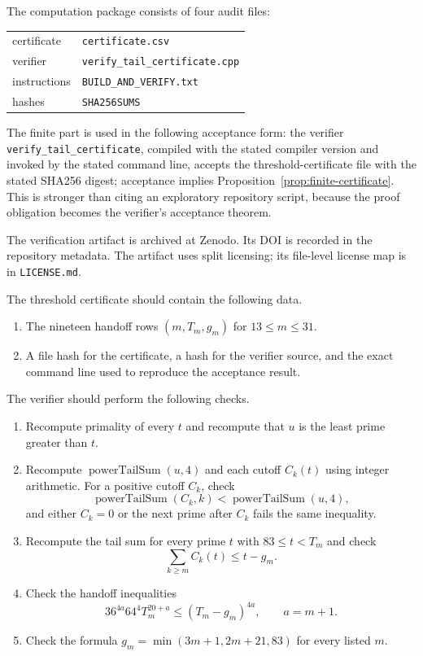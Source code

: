 \documentclass[11pt]{article}
\newcommand{\Pow}{\operatorname{powerTailSum}}
\begin{document}
The computation package consists of four audit files:
\begin{center}
\begin{tabular}{ll}
certificate & \nolinkurl{certificate.csv}\\
verifier & \nolinkurl{verify_tail_certificate.cpp}\\
instructions & \nolinkurl{BUILD_AND_VERIFY.txt}\\
hashes & \nolinkurl{SHA256SUMS}
\end{tabular}
\end{center}
The finite part is used in the following acceptance form: the verifier
\nolinkurl{verify_tail_certificate}, compiled with the stated compiler version
and invoked by the stated command line, accepts the threshold-certificate file
with the stated SHA256 digest; acceptance implies
Proposition~\ref{prop:finite-certificate}.  This is stronger than citing an
exploratory repository script, because the proof obligation becomes the
verifier's acceptance theorem.

The verification artifact is archived at Zenodo.  Its DOI is recorded in the
repository metadata.  The artifact uses split
licensing; its file-level license map is in \texttt{LICENSE.md}.

The threshold certificate should contain the following data.

\begin{enumerate}
\item The nineteen handoff rows \((m,T_m,g_m)\) for \(13\le m\le31\).
\item A file hash for the certificate, a hash for the verifier source, and
the exact command line used to reproduce the acceptance result.
\end{enumerate}

The verifier should perform the following checks.

\begin{enumerate}
\item Recompute primality of every \(t\) and recompute that \(u\) is the least
prime greater than \(t\).
\item Recompute \(\Pow(u,4)\) and each cutoff \(C_k(t)\) using integer
arithmetic.  For a positive cutoff \(C_k\), check
\[
  \Pow(C_k,k)<\Pow(u,4),
\]
and either \(C_k=0\) or the next prime after \(C_k\) fails the same inequality.
\item Recompute the tail sum for every prime \(t\) with \(83\le t<T_m\) and
check
\[
  \sum_{k\ge m}C_k(t)\le t-g_m.
\]
\item Check the handoff inequalities
\[
  36^{4a}64^4T_m^{20+a}\le (T_m-g_m)^{4a},
  \qquad a=m+1.
\]
\item Check the formula \(g_m=\min(3m+1,2m+21,83)\) for every listed \(m\).
\end{enumerate}
\end{document}

